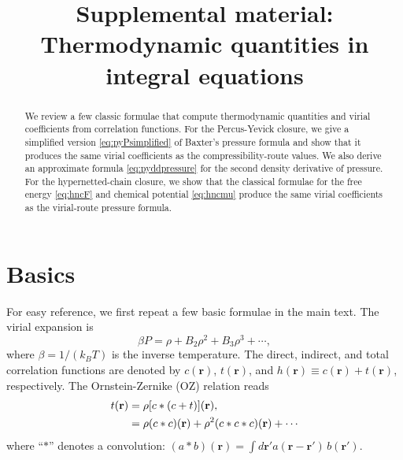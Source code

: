\documentclass[preprint]{revtex4-1}
\newcommand{\vct}[1]{\mathbf{#1}}
\providecommand{\vr}{} %
\renewcommand{\vr}{\vct{r}}
\begin{document}
\title{Supplemental material: Thermodynamic quantities in integral equations}

\begin{abstract}
We review a few classic formulae that compute thermodynamic quantities
  and virial coefficients from correlation functions.
%
For the Percus-Yevick closure,
  we give a simplified version \eqref{eq:pyPsimplified}
  of Baxter's pressure formula
  and show that it produces the same virial coefficients
  as the compressibility-route values.
%
We also derive an approximate formula \eqref{eq:pyddpressure}
  for the second density derivative of pressure.
%
For the hypernetted-chain closure,
  we show that the classical formulae
  for the free energy \eqref{eq:hncF}
  and chemical potential \eqref{eq:hncmu}
  produce the same virial coefficients
  as the virial-route pressure formula.
\end{abstract}

\maketitle






\section{Basics}

For easy reference,
we first repeat a few basic formulae in the main text.
%
The virial expansion is
%
\begin{equation}
  \beta P = \rho + B_2 \rho^2 + B_3 \rho^3 + \cdots,
\label{eq:virial}
\end{equation}
%
where $\beta = 1/(k_B T)$ is the inverse temperature.
%
The direct, indirect, and total correlation functions
  are denoted by $c(\vr)$, $t(\vr)$,
  and $h(\vr) \equiv c(\vr) + t(\vr)$,
  respectively.
%
The Ornstein-Zernike (OZ) relation\cite{hansen} reads
%
\begin{align}
  t(\vr) &= \rho [c * (c + t)](\vr), \notag \\
         &= \rho (c*c)(\vr) + \rho^2 (c*c*c)(\vr) + \cdots
\label{eq:oz}
\end{align}
%
where ``$*$'' denotes a convolution:
  $(a * b)(\vr) = \int d\vr' a(\vr - \vr') \, b(\vr')$.
%
\end{document}
